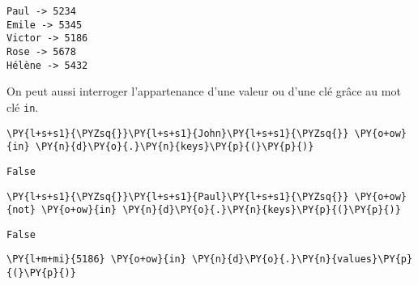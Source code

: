 \documentclass[12pt]{book}
\begin{document}
    \begin{Verbatim}[commandchars=\\\{\}]
Paul -> 5234
Emile -> 5345
Victor -> 5186
Rose -> 5678
Hélène -> 5432
    \end{Verbatim}

    On peut aussi interroger l'appartenance d'une valeur ou d'une clé grâce
au mot clé \texttt{in}.

    \begin{tcolorbox}[breakable, size=fbox, boxrule=1pt, pad at break*=1mm,colback=cellbackground, colframe=cellborder]
\begin{Verbatim}[commandchars=\\\{\}]
\PY{l+s+s1}{\PYZsq{}}\PY{l+s+s1}{John}\PY{l+s+s1}{\PYZsq{}} \PY{o+ow}{in} \PY{n}{d}\PY{o}{.}\PY{n}{keys}\PY{p}{(}\PY{p}{)}
\end{Verbatim}
\end{tcolorbox}

            \begin{tcolorbox}[breakable, size=fbox, boxrule=.5pt, pad at break*=1mm, opacityfill=0]
\begin{Verbatim}[commandchars=\\\{\}]
False
\end{Verbatim}
\end{tcolorbox}
        
    \begin{tcolorbox}[breakable, size=fbox, boxrule=1pt, pad at break*=1mm,colback=cellbackground, colframe=cellborder]
\begin{Verbatim}[commandchars=\\\{\}]
\PY{l+s+s1}{\PYZsq{}}\PY{l+s+s1}{Paul}\PY{l+s+s1}{\PYZsq{}} \PY{o+ow}{not} \PY{o+ow}{in} \PY{n}{d}\PY{o}{.}\PY{n}{keys}\PY{p}{(}\PY{p}{)}
\end{Verbatim}
\end{tcolorbox}

            \begin{tcolorbox}[breakable, size=fbox, boxrule=.5pt, pad at break*=1mm, opacityfill=0]
\begin{Verbatim}[commandchars=\\\{\}]
False
\end{Verbatim}
\end{tcolorbox}
        
    \begin{tcolorbox}[breakable, size=fbox, boxrule=1pt, pad at break*=1mm,colback=cellbackground, colframe=cellborder]
\begin{Verbatim}[commandchars=\\\{\}]
\PY{l+m+mi}{5186} \PY{o+ow}{in} \PY{n}{d}\PY{o}{.}\PY{n}{values}\PY{p}{(}\PY{p}{)}
\end{Verbatim}
\end{tcolorbox}
\end{document}

